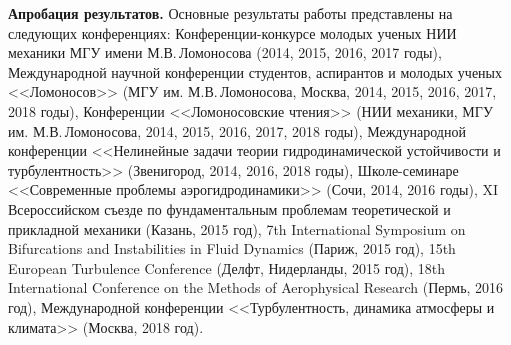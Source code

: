 \begin{comment}
{\bf Положения, выносимые на защиту.} Анализ модельных течений позволяет предложить следующий идеализированный цикл поддержания колебаний:

\noindent $1.$ В исследованных решениях поле скорости может быть представлено в виде суммы средней и пульсационной составляющих. Существенной особенностью среднего течения является наличие вытянутых вдоль потока полос повышенной и пониженной скорости. Пульсации возникают в результате линейной неустойчивости среднего течения в областях, расположенных между соседними полосами повышенной и пониженной скорости. В этих областях распределение средней продольной скорости имеет точки перегиба, если рассматривать его как функцию угловой (поперечной) координаты, что позволяет связать образование колебаний с неустойчивостью струйного течения с точками перегиба. 

\noindent $2.$ За поддержание полос повышенной и пониженной скорости ответственны продольные вихри, перемещающие жидкость в нормальной к основному потоку плоскости. Там, где медленная жидкость перемещается от стенки в основной поток, образуются полосы пониженной скорости. В промежуточных областях образуются полосы повышенной скорости. 

\noindent $3.$ Механизм поддержания продольных вихрей состоит в нелинейном взаимодействии пульсаций продольной скорости и пульсаций продольной завихренности. При этом в области расположения продольных вихрей пульсации продольной завихренности образуются в результате сжатия и растяжения существующих в потоке вихревых трубок пульсациями продольной скорости, что обеспечивает необходимую для поддержания продольных вихрей согласованность фаз между этими пульсациями. 
\end{comment}

{\bf Апробация результатов.} Основные результаты работы представлены на следующих конференциях: 
Конференции-конкурсе молодых ученых НИИ механики МГУ имени М.В.\,Ломоносова (2014, 2015, 2016, 2017 годы),
Международной научной конференции студентов, аспирантов и молодых ученых <<Ломоносов>> (МГУ им. М.В.\,Ломоносова, Москва, 2014, 2015, 2016, 2017, 2018 годы), 
Конференции <<Ломоносовские чтения>> (НИИ механики, МГУ им. М.В.\,Ломоносова, 2014, 2015, 2016, 2017, 2018 годы),
Международной конференции <<Нелинейные задачи теории гидродинамической устойчивости и турбулентность>> (Звенигород, 2014, 2016, 2018 годы),
Школе-семинаре <<Современные проблемы аэрогидродинамики>> (Сочи, 2014, 2016 годы),
XI Всероссийском съезде по фундаментальным проблемам теоретической и прикладной механики (Казань, 2015 год),
7th International Symposium on Bifurcations and Instabilities in Fluid Dynamics (Париж, 2015 год),
15th European Turbulence Conference (Делфт, Нидерланды, 2015 год),
18th International Conference on the Methods of Aerophysical Research (Пермь, 2016 год),
Международной конференции <<Турбулентность, динамика атмосферы и климата>> (Москва, 2018 год).

